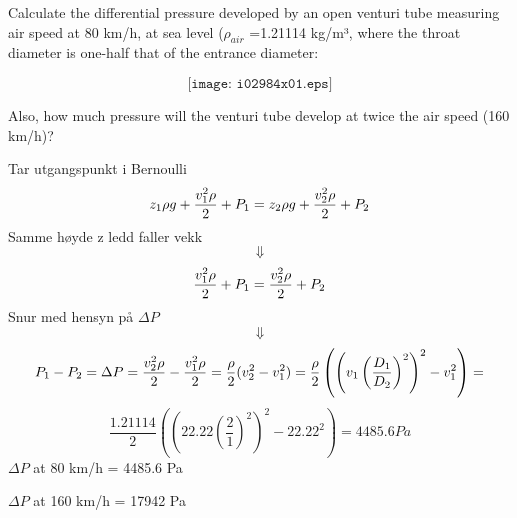 

Calculate the differential pressure developed by an open venturi tube measuring air speed at 80 km/h, at sea level ($\rho_{air}$ =1.21114 kg/m³, where the throat diameter is one-half that of the entrance diameter:

$$\texttt{[image: i02984x01.eps]}$$

Also, how much pressure will the venturi tube develop at twice the air speed (160 km/h)?






Tar utgangspunkt i Bernoulli
$$z_1 \rho g + {v_1^2 \rho \over 2} + P_1 = z_2 \rho g + {v_2^2 \rho \over 2} + P_2$$
Samme høyde z ledd faller vekk$$ \Downarrow $$
$${v_1^2 \rho \over 2} + P_1 = {v_2^2 \rho \over 2} + P_2$$
Snur med hensyn på $\Delta P$ $$ \Downarrow $$
$$ P_1-P_2=\Delta P = {v_2^2 \rho \over 2} -{v_1^2 \rho \over 2}=\frac{\rho}{2}(v_2^2-v_1^2)=\frac{\rho}{2}\left(\left(v_1 \left(\frac{D_1}{D_2}\right)^2\right)^2-v_1^2\right)= $$
$$\frac{1.21114}{2}\left(\left(22.22 \left(\frac{2}{1}\right)^2\right)^2-22.22^2\right)=4485.6 Pa $$
$\Delta P$ at 80 km/h = 4485.6 Pa 
\vskip 10pt

$\Delta P$ at 160 km/h =  17942 Pa










